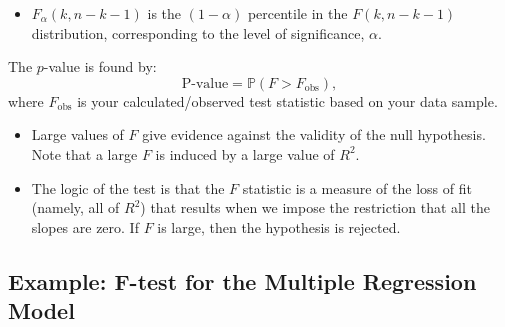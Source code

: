 \documentclass[
  12pt,
  letterpaper,
]{scrbook}
\providecommand{\tightlist}{%
  \setlength{\itemsep}{0pt}\setlength{\parskip}{0pt}}
\renewcommand{\tightlist}{\setlength{\itemsep}{0.5\baselineskip}\setlength{\parskip}{0.2\baselineskip}}
\theoremstyle{definition}
\theoremstyle{plain}
\theoremstyle{remark}
\begin{document}
\begin{itemize}
\tightlist
\item
  \(F_{\alpha}(k,n-k-1)\) is the \((1-\alpha)\) percentile in the
  \(F(k, n-k-1)\) distribution, corresponding to the level of
  significance, \(\alpha\).
\end{itemize}

The \(p\)-value is found by: \[
\text{P-value} = \mathbb{P}(F>F_{\text{obs}}) ,
\] where \(F_{\text{obs}}\) is your calculated/observed test statistic
based on your data sample.

\begin{itemize}
\item
  Large values of \(F\) give evidence against the validity of the null
  hypothesis. Note that a large \(F\) is induced by a large value of
  \(R^2\).
\item
  The logic of the test is that the \(F\) statistic is a measure of the
  loss of fit (namely, all of \(R^2\)) that results when we impose the
  restriction that all the slopes are zero. If \(F\) is large, then the
  hypothesis is rejected.
\end{itemize}

\subsection{Example: F-test for the Multiple Regression
Model}\label{example-f-test-for-the-multiple-regression-model}
\end{document}
